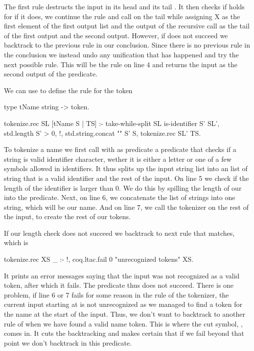 \documentclass[thesis.tex]{subfiles}
\begin{document}
{{{The first rule destructs the input in its head  and its tail . It then checks if  holds for  if it does, we continue the rule and call  on the tail while assigning X as the first element of the first output list and the output of the recursive call as the tail of the first output and the second output. However, if  does not succeed we backtrack to the previous rule in our conclusion. Since there is no previous rule in the conclusion we instead undo any unification that has happened and try the next possible rule. This will be the rule on line 4 and returns the input as the second output of the predicate.

We can use  to define the rule for the token
\begin{elpicode}
  type tName string -> token.

  tokenize.rec SL [tName S | TS] :-
    take-while-split SL is-identifier S' SL',
    { std.length S' } > 0, !,
    std.string.concat "" S' S,
    tokenize.rec SL' TS.
\end{elpicode}
To tokenize a name we first call  with as predicate a predicate that checks if a string is valid identifier character, wether it is either a letter or one of a few symbols allowed in identifiers. It thus splits up the input string list into an list of string that is a valid identifier and the rest of the input.
On line 5 we check if the length of the identifier is larger than 0. We do this by spilling the length of our  into the \elpiinline{>} predicate.
Next, on line 6, we concatenate the list of strings into one string, which will be our name.
And on line 7, we call the tokenizer on the rest of the input, to create the rest of our tokens.

If our length check does not succeed we backtrack to next rule that matches, which is
\begin{elpicode}
  tokenize.rec XS _ :- !, coq.ltac.fail 0 "unrecognized tokens" XS.  
\end{elpicode}
It prints an error messages saying that the input was not recognized as a valid token, after which it fails. The predicate thus does not succeed. There is one problem, if line 6 or 7 fails for some reason in the  rule of the tokenizer, the current input starting at  is not unrecognized as we managed to find a token for the name at the start of the input. Thus, we don't want to backtrack to another rule of  when we have found a valid name token. This is where the cut symbol, \elpiinline{!}, comes in. It cuts the backtracking and makes certain that if we fail beyond that point we don't backtrack in this predicate.

}}}
\end{document}
